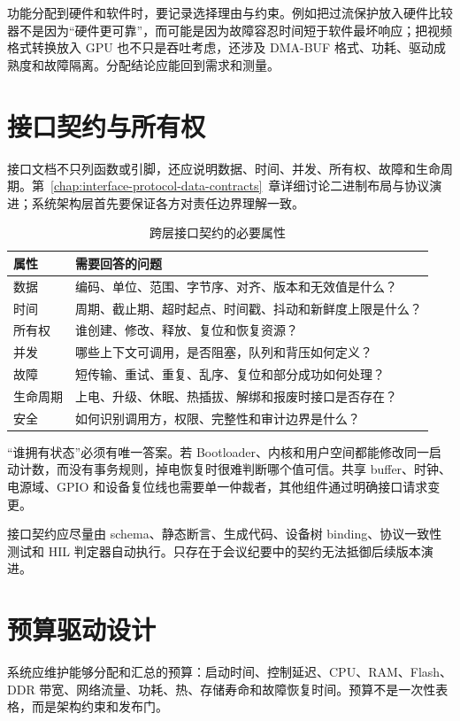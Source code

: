 功能分配到硬件和软件时，要记录选择理由与约束。例如把过流保护放入硬件比较器不是因为“硬件更可靠”，而可能是因为故障容忍时间短于软件最坏响应；把视频格式转换放入 GPU 也不只是吞吐考虑，还涉及 DMA-BUF 格式、功耗、驱动成熟度和故障隔离。分配结论应能回到需求和测量。

\section{接口契约与所有权}

接口文档不只列函数或引脚，还应说明数据、时间、并发、所有权、故障和生命周期。第~\ref{chap:interface-protocol-data-contracts}~章详细讨论二进制布局与协议演进；系统架构层首先要保证各方对责任边界理解一致。

\begin{table}[H]
  \centering
  \caption{跨层接口契约的必要属性}
  \begin{tabular}{p{30mm}p{110mm}}
    \hline
    属性 & 需要回答的问题 \\
    \hline
    数据 & 编码、单位、范围、字节序、对齐、版本和无效值是什么？ \\
    时间 & 周期、截止期、超时起点、时间戳、抖动和新鲜度上限是什么？ \\
    所有权 & 谁创建、修改、释放、复位和恢复资源？ \\
    并发 & 哪些上下文可调用，是否阻塞，队列和背压如何定义？ \\
    故障 & 短传输、重试、重复、乱序、复位和部分成功如何处理？ \\
    生命周期 & 上电、升级、休眠、热插拔、解绑和报废时接口是否存在？ \\
    安全 & 如何识别调用方，权限、完整性和审计边界是什么？ \\
    \hline
  \end{tabular}
\end{table}

“谁拥有状态”必须有唯一答案。若 Bootloader、内核和用户空间都能修改同一启动计数，而没有事务规则，掉电恢复时很难判断哪个值可信。共享 buffer、时钟、电源域、GPIO 和设备复位线也需要单一仲裁者，其他组件通过明确接口请求变更。

接口契约应尽量由 schema、静态断言、生成代码、设备树 binding、协议一致性测试和 HIL 判定器自动执行。只存在于会议纪要中的契约无法抵御后续版本演进。

\section{预算驱动设计}

系统应维护能够分配和汇总的预算：启动时间、控制延迟、CPU、RAM、Flash、DDR 带宽、网络流量、功耗、热、存储寿命和故障恢复时间。预算不是一次性表格，而是架构约束和发布门。

